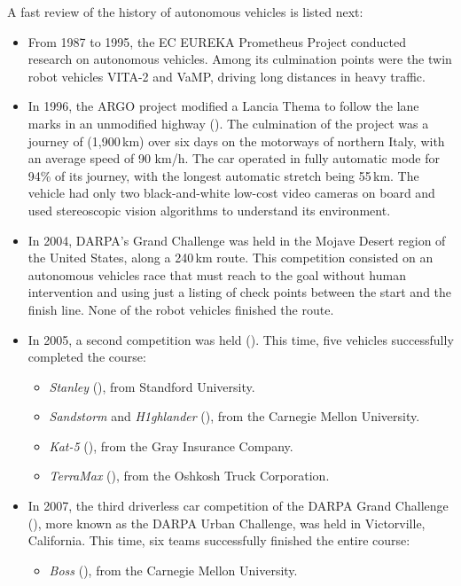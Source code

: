 A fast review of the history of autonomous vehicles is listed next:
\begin{itemize}
\item From 1987 to 1995, the EC EUREKA Prometheus Project conducted research on autonomous vehicles. Among its culmination points were the twin robot vehicles VITA-2 and VaMP, driving long distances in heavy traffic.
\item In 1996, the ARGO project modified a Lancia Thema to follow the lane marks in an unmodified highway (\cite{Broggi1999}). The culmination of the project was a journey of (1,900\,km) over six days on the motorways of northern Italy, with an average speed of 90 km/h. The car operated in fully automatic mode for 94\% of its journey, with the longest automatic stretch being 55\,km. The vehicle had only two black-and-white low-cost video cameras on board and used stereoscopic vision algorithms to understand its environment. 
 \item In 2004, DARPA's Grand Challenge was held in the Mojave Desert region of the United States, along a 240\,km route. This competition consisted on an autonomous vehicles race that must reach to the goal without human intervention and using just a listing of check points between the start and the finish line. None of the robot vehicles finished the route.
 \item In 2005, a second competition was held (\cite{Buehler2007}). This time, five vehicles successfully completed the course:
 \begin{itemize}
  \item \emph{Stanley} (\cite{thrun2006stanley}), from Standford University.
  \item \emph{Sandstorm} and \emph{H1ghlander} (\cite{urmson2004high}), from the Carnegie Mellon University.
  \item \emph{Kat-5} (\cite{trepagnier2006kat}), from the Gray Insurance Company.
  \item \emph{TerraMax} (\cite{ozguner2004team}), from the Oshkosh Truck Corporation.
 \end{itemize}
 \item In 2007, the third driverless car competition of the DARPA Grand Challenge (\cite{Buehler2009}), more known as the DARPA Urban Challenge, was held in Victorville, California. This time, six teams successfully finished the entire course:
 \begin{itemize}
  \item \emph{Boss} (\cite{Urmson2008}), from the Carnegie Mellon University.

\end{itemize}
\end{itemize}
